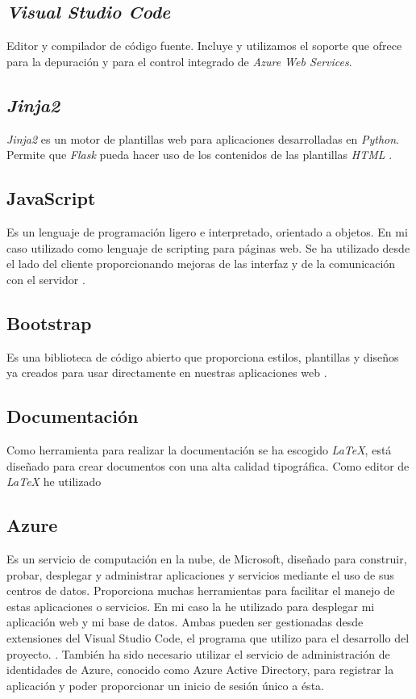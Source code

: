 \subsection{\textit{Visual Studio Code}}
Editor y compilador de código fuente. Incluye y utilizamos el soporte que ofrece para la depuración y para el control integrado de \textit{Azure Web Services}.

\subsection{\textit{Jinja2}}
\textit{Jinja2} es un motor de plantillas web para aplicaciones desarrolladas en \textit{Python}. Permite que \textit{Flask} pueda hacer uso de los contenidos de las plantillas \textit{HTML} \cite{wiki:jinja2}.

\subsection{JavaScript}
Es un lenguaje de programación ligero e interpretado, orientado a objetos. En mi caso utilizado como lenguaje de scripting para páginas web. Se ha utilizado desde el lado del cliente proporcionando mejoras de las interfaz y de la comunicación con el servidor \cite{wiki:javascript}.

\subsection{Bootstrap}
Es una biblioteca de código abierto que proporciona estilos, plantillas y diseños ya creados para usar directamente en nuestras aplicaciones web \cite{wiki:bootstrap}.

\subsection{Documentación}
Como herramienta para realizar la documentación se ha escogido \textit{LaTeX}, está diseñado para crear documentos con una alta calidad tipográfica. Como editor de \textit{LaTeX} he utilizado 

\subsection{Azure}
Es un servicio de computación en la nube, de Microsoft, diseñado para construir, probar, desplegar y administrar aplicaciones y servicios mediante el uso de sus centros de datos. Proporciona muchas herramientas para facilitar el manejo de estas aplicaciones o servicios. En mi caso la he utilizado para desplegar mi aplicación web y mi base de datos. Ambas pueden ser gestionadas desde extensiones del Visual Studio Code, el programa que utilizo para el desarrollo del proyecto. \cite{wiki:azure}.\newline
También ha sido necesario utilizar el servicio de administración de identidades de Azure, conocido como Azure Active Directory, para registrar la aplicación y poder proporcionar un inicio de sesión único a ésta.

